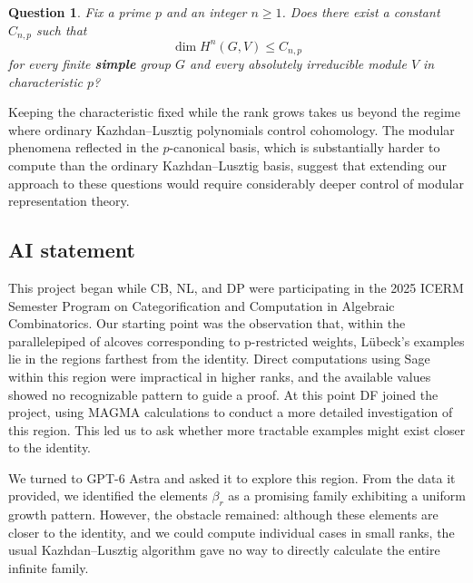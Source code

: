 \documentclass[11pt,a4paper,reqno]{amsart}
\numberwithin{equation}{section}
\newtheorem{question}{Question}
\theoremstyle{definition}
\theoremstyle{remark}
\theoremstyle{plain}
\begin{document}
\begin{question}\label{question:fixed-characteristic-higher}
Fix a prime $p$ and an integer $n\geq 1$. Does there exist a constant
$C_{n,p}$ such that
\[
\dim H^n(G,V)\leq C_{n,p}
\]
for every finite \textbf{simple} group $G$ and every absolutely irreducible
module $V$ in characteristic $p$?
\end{question}
 
Keeping the characteristic fixed while the rank grows takes us
beyond the regime where ordinary Kazhdan--Lusztig polynomials control
cohomology. The modular phenomena reflected in the
$p$-canonical basis, which is substantially harder to compute
than the ordinary Kazhdan--Lusztig basis, suggest that extending
our approach to these questions would require considerably
deeper control of modular representation theory.
 
 


\subsection*{AI statement}
This project began while CB, NL, and DP were participating in the 2025 ICERM Semester Program on Categorification and Computation in Algebraic Combinatorics. 
  Our starting point was the observation that, within the parallelepiped of alcoves corresponding to p-restricted weights, Lübeck’s examples lie in the regions farthest from the identity. 
  Direct computations using Sage within this region were impractical in higher ranks, and the available values showed no recognizable pattern to guide a proof. 
  At this point DF joined the project, using MAGMA calculations to conduct a more detailed investigation of this region.
  This led us to ask whether more tractable examples might exist closer to the identity.

We turned to GPT-6 Astra and asked it to explore this region. From the data it provided, we identified the elements $\beta_r$ as a promising family exhibiting a uniform growth pattern. 
 However, the obstacle remained: although these elements are closer to the identity, and we could compute individual cases in small ranks, the usual Kazhdan--Lusztig algorithm gave no way to directly calculate the entire infinite family.
\end{document}
